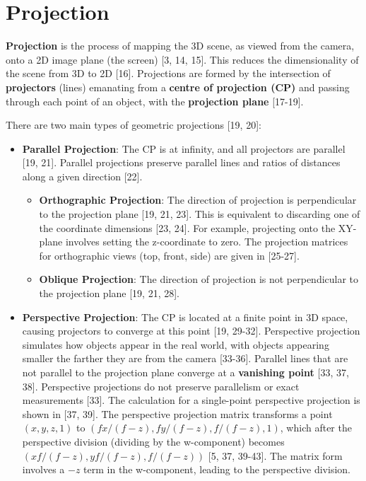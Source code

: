 \documentclass[12pt]{article}
\begin{document}
\section{Projection}

\textbf{Projection} is the process of mapping the 3D scene, as viewed from the camera, onto a 2D image plane (the screen) [3, 14, 15]. This reduces the dimensionality of the scene from 3D to 2D [16]. Projections are formed by the intersection of \textbf{projectors} (lines) emanating from a \textbf{centre of projection (CP)} and passing through each point of an object, with the \textbf{projection plane} [17-19].

There are two main types of geometric projections [19, 20]:

\begin{itemize}
    \item \textbf{Parallel Projection}: The CP is at infinity, and all projectors are parallel [19, 21]. Parallel projections preserve parallel lines and ratios of distances along a given direction [22].
    \begin{itemize}
        \item \textbf{Orthographic Projection}: The direction of projection is perpendicular to the projection plane [19, 21, 23]. This is equivalent to discarding one of the coordinate dimensions [23, 24]. For example, projecting onto the XY-plane involves setting the z-coordinate to zero. The projection matrices for orthographic views (top, front, side) are given in [25-27].
        \item \textbf{Oblique Projection}: The direction of projection is not perpendicular to the projection plane [19, 21, 28].
    \end{itemize}
    \item \textbf{Perspective Projection}: The CP is located at a finite point in 3D space, causing projectors to converge at this point [19, 29-32]. Perspective projection simulates how objects appear in the real world, with objects appearing smaller the farther they are from the camera [33-36]. Parallel lines that are not parallel to the projection plane converge at a \textbf{vanishing point} [33, 37, 38]. Perspective projections do not preserve parallelism or exact measurements [33]. The calculation for a single-point perspective projection is shown in [37, 39]. The perspective projection matrix transforms a point $(x, y, z, 1)$ to $(fx/(f-z), fy/(f-z), f/(f-z), 1)$, which after the perspective division (dividing by the w-component) becomes $(x f/(f-z), y f/(f-z), f/(f-z))$ [5, 37, 39-43]. The matrix form involves a $-z$ term in the w-component, leading to the perspective division.
\end{itemize}
\end{document}
